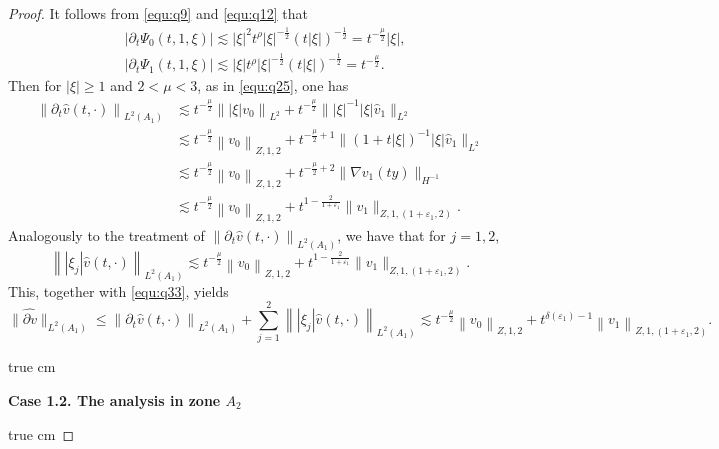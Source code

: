 \documentclass[11pt,twoside]{article}
\newcommand{\p}{\partial}
\newcommand{\f}{\frac}
\theoremstyle{plain}
\theoremstyle{definition}
\theoremstyle{remark}
\numberwithin{equation}{section}
\begin{document}
\begin{proof}
It follows from \eqref{equ:q9} and  \eqref{equ:q12} that
\begin{equation}\label{equ:q32}
\begin{aligned}
& \left|\p_t\Psi_0(t, 1,\xi)\right| \lesssim|\xi|^2 t^\rho|\xi|^{-\frac{1}{2}}(t|\xi|)^{-\frac{1}{2}}=t^{-\frac{\mu}{2}}|\xi|, \\
& \left|\p_t\Psi_1(t, 1, \xi)\right|  \lesssim |\xi|t^\rho|\xi|^{-\frac{1}{2}}(t|\xi|)^{-\frac{1}{2}}=t^{-\frac{\mu}{2}}.
\end{aligned}
\end{equation}
Then for $|\xi| \geq 1$ and $2<\mu<3$, as in \eqref{equ:q25}, one has
\begin{equation}\label{equ:q33}
\begin{aligned}
\left\|\p_t\hat{v}(t, \cdot)\right\|_{L^2(A_1)}
& \lesssim t^{-\frac{\mu}{2}}\left\||\xi|v_{0}\right\|_{L^{2}}+t^{-\f{\mu}{2}} \||\xi|^{-1}|\xi|\hat{v}_{1}\|_{L^{2}}\\
& \lesssim t^{-\frac{\mu}{2}}\left\|v_{0}\right\|_{Z, 1, 2}+t^{-\f{\mu}{2}+1} \|(1+t|\xi|)^{-1}|\xi|\hat{v}_{1}\|_{L^{2}}\\
& \lesssim t^{-\frac{\mu}{2}}\left\|v_{0}\right\|_{Z, 1, 2}+  t^{-\f{\mu}{2}+2}\|\nabla v_1(ty)\|_{H^{-1}}\\
&\lesssim t^{-\frac{\mu}{2}}\left\|v_{0}\right\|_{Z, 1, 2}+  t^{1-\f{2}{1+\varepsilon_1}}\|v_1\|_{Z, 1, (1+\varepsilon_1,2)}.
\end{aligned}
\end{equation}
Analogously to the treatment of $\left\|\p_t\hat{v}(t, \cdot)\right\|_{L^2(A_1)}$, we have that for $j=1, 2$,
\begin{equation}\label{equ:q34}
\left\||\xi_j|\hat{v}(t, \cdot)\right\|_{L^2(A_1)}
\lesssim t^{-\frac{\mu}{2}}\left\|v_{0}\right\|_{Z, 1, 2}+  t^{1-\f{2}{1+\varepsilon_1}}\|v_1\|_{Z, 1, (1+\varepsilon_1,2)}.
\end{equation}
This, together with \eqref{equ:q33}, yields
\begin{equation}\label{equ:q35}
\|\widehat{\p v}\|_{L^2(A_1)}\leq \left\|\p_t\hat{v}(t, \cdot)\right\|_{L^2(A_1)}+\sum_{j=1}^{2}\left\||\xi_j|\hat{v}(t, \cdot)\right\|_{L^2(A_1)} \lesssim t^{-\f{\mu}{2}}\left\|v_0\right\|_{Z, 1, 2}+t^{\delta(\varepsilon_1)-1}\left\|v_1\right\|_{Z, 1,(1+\varepsilon_1, 2)}.
\end{equation}

 true cm

{\bf Case 1.2.  The analysis  in zone $A_2$}

 true cm


\end{proof}
\end{document}
